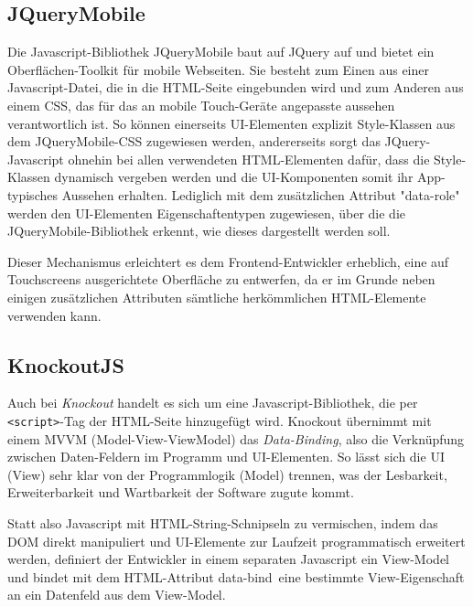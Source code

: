 \subsection{JQueryMobile}
Die Javascript-Bibliothek JQueryMobile baut auf JQuery auf und bietet ein Oberflächen-Toolkit für mobile Webseiten. Sie besteht zum Einen aus einer Javascript-Datei, die in die HTML-Seite eingebunden wird und zum Anderen aus einem CSS, das für das an mobile Touch-Geräte angepasste aussehen verantwortlich ist. 
So können einerseits UI-Elementen explizit Style-Klassen aus dem JQueryMobile-CSS zugewiesen werden, andererseits sorgt das JQuery-Javascript ohnehin bei allen verwendeten HTML-Elementen dafür, dass die Style-Klassen dynamisch vergeben werden und die UI-Komponenten somit ihr App-typisches Aussehen erhalten.
Lediglich mit dem zusätzlichen Attribut "data-role" werden den UI-Elementen Eigenschaftentypen zugewiesen, über die die JQueryMobile-Bibliothek erkennt, wie dieses dargestellt werden soll.

Dieser Mechanismus erleichtert es dem Frontend-Entwickler erheblich, eine auf Touchscreens ausgerichtete Oberfläche zu entwerfen, da er im Grunde neben einigen zusätzlichen Attributen sämtliche herkömmlichen HTML-Elemente verwenden kann. 

\subsection{KnockoutJS}
Auch bei \emph{Knockout} handelt es sich um eine Javascript-Bibliothek, die per \mbox{\texttt{<script>}-Tag} der HTML-Seite hinzugefügt wird. Knockout übernimmt mit einem MVVM (Model-View-ViewModel) das \emph{Data-Binding}, also die Verknüpfung zwischen Daten-Feldern im Programm und UI-Elementen.
So lässt sich die UI (View) sehr klar von der Programmlogik (Model) trennen, was der Lesbarkeit, Erweiterbarkeit und Wartbarkeit der Software zugute kommt.

Statt also Javascript mit HTML-String-Schnipseln zu vermischen, indem das DOM direkt manipuliert und UI-Elemente zur Laufzeit
programmatisch erweitert werden, definiert der Entwickler in einem separaten Javascript ein View-Model und bindet mit dem HTML-Attribut \glqq data-bind\grqq \ eine bestimmte View-Eigenschaft an ein Datenfeld aus dem View-Model.
